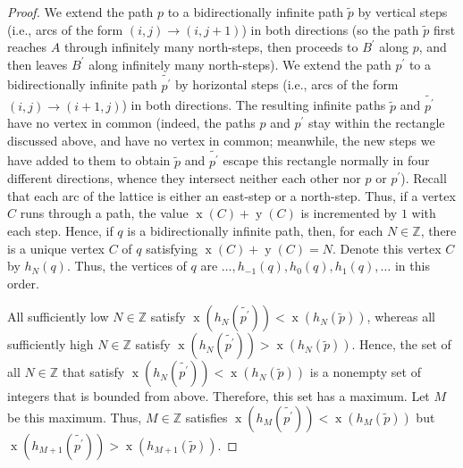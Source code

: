 \documentclass[reqno]{amsart}%
\newcommand{\0}{\phantom{c}}
\theoremstyle{plain}
\theoremstyle{definition}
\numberwithin{equation}{section}
\begin{document}
\begin{proof}
We extend the path $p$ to a bidirectionally infinite path $\widetilde{p}$ by
vertical steps (i.e., arcs of the form $\left(  i,j\right)  \rightarrow\left(
i,j+1\right)  $) in both directions (so the path $\widetilde{p}$ first reaches
$A$ through infinitely many north-steps, then proceeds to $B^{\prime}$ along
$p$, and then leaves $B^{\prime}$ along infinitely many north-steps). We
extend the path $p^{\prime}$ to a bidirectionally infinite path
$\widetilde{p^{\prime}}$ by horizontal steps (i.e., arcs of the form $\left(
i,j\right)  \rightarrow\left(  i+1,j\right)  $) in both directions. The
resulting infinite paths $\widetilde{p}$ and $\widetilde{p^{\prime}}$ have no
vertex in common (indeed, the paths $p$ and $p^{\prime}$ stay within the
rectangle discussed above, and have no vertex in common; meanwhile, the new
steps we have added to them to obtain $\widetilde{p}$ and
$\widetilde{p^{\prime}}$ escape this rectangle normally in four different
directions, whence they intersect neither each other nor $p$ or $p^{\prime}$).
Recall that each arc of the lattice is either an east-step or a north-step.
Thus, if a vertex $C$ runs through a path, the value $\operatorname*{x}\left(
C\right)  +\operatorname*{y}\left(  C\right)  $ is incremented by $1$ with
each step. Hence, if $q$ is a bidirectionally infinite path, then, for each
$N\in\mathbb{Z}$, there is a unique vertex $C$ of $q$ satisfying
$\operatorname*{x}\left(  C\right)  +\operatorname*{y}\left(  C\right)  =N$.
Denote this vertex $C$ by $h_{N}\left(  q\right)  $. Thus, the vertices of $q$
are $\ldots,h_{-1}\left(  q\right)  ,h_{0}\left(  q\right)  ,h_{1}\left(
q\right)  ,\ldots$ in this order.

All sufficiently low $N\in\mathbb{Z}$ satisfy $\operatorname*{x}\left(
h_{N}\left(  \widetilde{p^{\prime}}\right)  \right)  <\operatorname*{x}\left(
h_{N}\left(  \widetilde{p}\right)  \right)  $, whereas all sufficiently high
$N\in\mathbb{Z}$ satisfy $\operatorname*{x}\left(  h_{N}\left(
\widetilde{p^{\prime}}\right)  \right)  >\operatorname*{x}\left(  h_{N}\left(
\widetilde{p}\right)  \right)  $. Hence, the set of all $N\in\mathbb{Z}$ that
satisfy $\operatorname*{x}\left(  h_{N}\left(  \widetilde{p^{\prime}}\right)
\right)  <\operatorname*{x}\left(  h_{N}\left(  \widetilde{p}\right)  \right)
$ is a nonempty set of integers that is bounded from above. Therefore, this
set has a maximum. Let $M$ be this maximum. Thus, $M\in\mathbb{Z}$ satisfies
$\operatorname*{x}\left(  h_{M}\left(  \widetilde{p^{\prime}}\right)  \right)
<\operatorname*{x}\left(  h_{M}\left(  \widetilde{p}\right)  \right)  $ but
$\operatorname*{x}\left(  h_{M+1}\left(  \widetilde{p^{\prime}}\right)
\right)  >\operatorname*{x}\left(  h_{M+1}\left(  \widetilde{p}\right)
\right)  $.


\end{proof}
\end{document}
